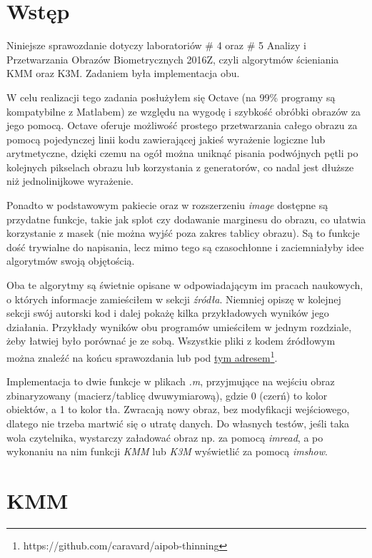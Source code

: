 \documentclass[11pt]{article}
\begin{document}
\section{Wstęp}
\par
Niniejsze sprawozdanie dotyczy laboratoriów \# 4 oraz \# 5 Analizy i Przetwarzania Obrazów Biometrycznych 2016Z, czyli algorytmów ścieniania KMM oraz K3M. Zadaniem była implementacja obu.
\par
W celu realizacji tego zadania posłużyłem się Octave (na 99\% programy są kompatybilne z  Matlabem) ze względu na wygodę i szybkość obróbki obrazów za jego pomocą. Octave oferuje możliwość prostego przetwarzania całego obrazu za pomocą pojedynczej linii kodu zawierającej jakieś wyrażenie logiczne lub arytmetyczne, dzięki czemu na ogół można uniknąć pisania podwójnych pętli po kolejnych pikselach obrazu lub korzystania z generatorów, co nadal jest dłuższe niż jednolinijkowe wyrażenie. 
\par
Ponadto w podstawowym pakiecie oraz w rozszerzeniu \textit{image} dostępne są przydatne funkcje, takie jak splot czy dodawanie marginesu do obrazu, co ułatwia korzystanie z masek (nie można wyjść poza zakres tablicy obrazu). Są to funkcje dość trywialne do napisania, lecz mimo tego są czasochłonne i zaciemniałyby idee algorytmów swoją objętością.
\par
Oba te algorytmy są świetnie opisane w odpowiadającym im pracach naukowych, o których informacje zamieściłem w sekcji \textit{źródła}. Niemniej opiszę w kolejnej sekcji swój autorski kod i dalej pokażę kilka przykładowych wyników jego działania. Przykłady wyników obu programów umieściłem w jednym rozdziale, żeby łatwiej było porównać je ze sobą. Wszystkie pliki z kodem źródłowym można znaleźć na końcu sprawozdania lub pod \href{https://github.com/caravard/aipob-thinning}{tym adresem}\footnote{https://github.com/caravard/aipob-thinning}.
\par
Implementacja to dwie funkcje w plikach \textit{.m}, przyjmujące na wejściu obraz zbinaryzowany (macierz/tablicę dwuwymiarową), gdzie 0 (czerń) to kolor obiektów, a 1 to kolor tła. Zwracają nowy obraz, bez modyfikacji wejściowego, dlatego nie trzeba martwić się o utratę danych. Do własnych testów, jeśli taka wola czytelnika, wystarczy załadować obraz np. za pomocą \textit{imread}, a po wykonaniu na nim funkcji \textit{KMM} lub \textit{K3M} wyświetlić za pomocą \textit{imshow}.

\section{KMM}
\end{document}
